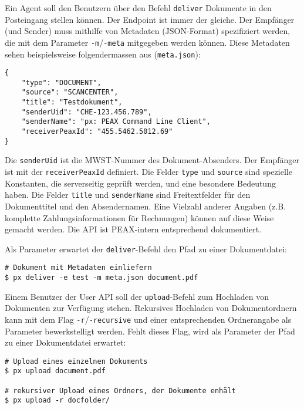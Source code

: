 Ein Agent soll den Benutzern über den Befehl \texttt{deliver} Dokumente in den Posteingang stellen können. Der Endpoint ist immer der gleiche. Der Empfänger (und Sender) muss mithilfe von Metadaten (JSON-Format) spezifiziert werden, die mit dem Parameter \texttt{-m}/\texttt{-meta} mitgegeben werden können. Diese Metadaten sehen beispielsweise folgendermassen aus (\texttt{meta.json}):

\begin{lstlisting}[caption={Metadaten für die Dokument-Einflieferung}]
{
    "type": "DOCUMENT",
    "source": "SCANCENTER",
    "title": "Testdokument",
    "senderUid": "CHE-123.456.789",
    "senderName": "px: PEAX Command Line Client",
    "receiverPeaxId": "455.5462.5012.69"
}
\end{lstlisting}

Die \texttt{senderUid} ist die MWST-Nummer des Dokument-Absenders. Der Empfänger ist mit der \texttt{receiverPeaxId} definiert. Die Felder \texttt{type} und \texttt{source} sind spezielle Konstanten, die serverseitig geprüft werden, und eine besondere Bedeutung haben. Die Felder \texttt{title} und \texttt{senderName} sind Freitextfelder für den Dokumenttitel und den Absendernamen. Eine Vielzahl anderer Angaben (z.B. komplette Zahlungsinformationen für Rechnungen) können auf diese Weise gemacht werden. Die API ist PEAX-intern entsprechend dokumentiert.

Als Parameter erwartet der \texttt{deliver}-Befehl den Pfad zu einer Dokumentdatei:

\begin{lstlisting}[caption={Dokument-Einlieferung über die Delivery-Schnittstelle}]
# Dokument mit Metadaten einliefern
$ px deliver -e test -m meta.json document.pdf
\end{lstlisting}

Einem Benutzer der User API soll der \texttt{upload}-Befehl zum Hochladen von Dokumenten zur Verfügung stehen. Rekursives Hochladen von Dokumentordnern kann mit dem Flag \texttt{-r}/\texttt{-recursive} und einer entsprechenden Ordnerangabe als Parameter bewerkstelligt werden. Fehlt dieses Flag, wird als Parameter der Pfad zu einer Dokumentdatei erwartet:


\begin{lstlisting}[caption={Hochladen von Dateien}]
# Upload eines einzelnen Dokuments
$ px upload document.pdf

# rekursiver Upload eines Ordners, der Dokumente enhält
$ px upload -r docfolder/
\end{lstlisting}

